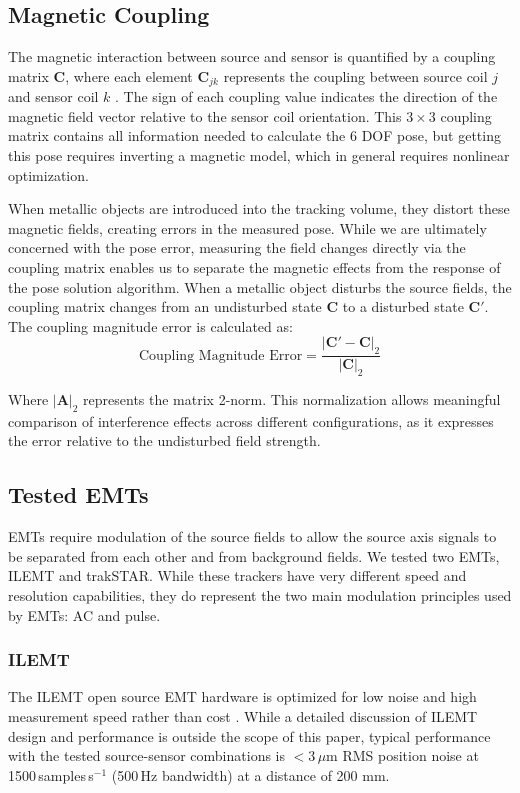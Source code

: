 \documentclass[journal,twoside,web]{ieeecolor}
\begin{document}
\subsection{Magnetic Coupling}
\label{subsec:coupling}
The magnetic interaction between source and sensor is quantified by a coupling matrix $\mathbf{C}$, where each element $\mathbf{C}_{jk}$ represents the coupling between source coil $j$ and sensor coil $k$ \cite{maclachlan_calibration_2025}. The sign of each coupling value indicates the direction of the magnetic field vector relative to the sensor coil orientation. This $3 \times 3$ coupling matrix contains all information needed to calculate the 6 DOF pose, but getting this pose requires inverting a magnetic model, which in general requires nonlinear optimization. 

When metallic objects are introduced into the tracking volume, they distort these magnetic fields, creating errors in the measured pose. While we are ultimately concerned with the pose error, measuring the field changes directly via the coupling matrix enables us to separate  the magnetic effects from the response of the pose solution algorithm. When a metallic object disturbs the source fields, the coupling matrix changes from an undisturbed state $\mathbf{C}$ to a disturbed state $\mathbf{C}'$. The coupling magnitude error is calculated as:
\begin{equation}
\text{Coupling Magnitude Error} = \frac{|\mathbf{C}' - \mathbf{C}|_2}{|\mathbf{C}|_2}
\end{equation}

Where $|\mathbf{A}|_2$ represents the matrix 2-norm. This normalization allows meaningful comparison of interference effects across different configurations, as it expresses the error relative to the undisturbed field strength.

\subsection{Tested EMTs}
\label{subsec:tested_emts}
EMTs require modulation of the source fields to allow the source axis signals to be separated from each other and from background fields. We tested two EMTs, ILEMT and trakSTAR. While these trackers have very different speed and resolution capabilities, they do represent the two main modulation principles used by EMTs: AC and pulse. 

\subsubsection{ILEMT}
The ILEMT open source EMT hardware is optimized for low noise and high measurement speed rather than cost \cite{maclachlan_electromagnetic_2016}. While a detailed discussion of ILEMT design and performance is outside the scope of this paper, typical performance with the tested source-sensor combinations is $<3\,\mu$m RMS position noise at 1500\,samples\,s$^{-1}$ (500\,Hz bandwidth) at a distance of 200 mm.
\end{document}
